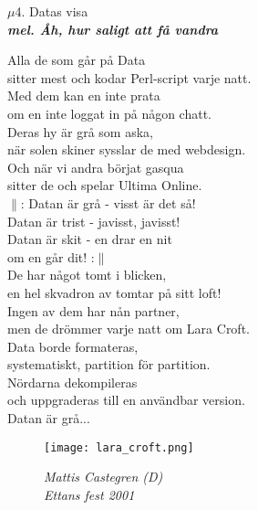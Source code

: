 \documentclass[a6paper,10pt]{article}
\newcommand{\mel}[1]{\small\textbf{\textit{mel. #1 \\}}}
\begin{document}
\setlength{\oddsidemargin}{-0.47in}
\noindent
\begin{center}
\Large $\mu$4. Datas visa\\
\mel{Åh, hur saligt att få vandra}
\end{center}
\vspace{-5pt}
Alla de som går på Data\\
sitter mest och kodar Perl-script varje natt.\\
Med dem kan en inte prata\\
om en inte loggat in på någon chatt.\\
Deras hy är grå som aska,\\
när solen skiner sysslar de med webdesign.\\
Och när vi andra börjat gasqua\\
sitter de och spelar Ultima Online.
\vspace{5pt}\\
$\|$: Datan är grå - visst är det så!\\
Datan är trist - javisst, javisst!\\
Datan är skit - en drar en nit\\
om en går dit! :$\|$
\vspace{5pt}\\
De har något tomt i blicken,\\
en hel skvadron av tomtar på sitt loft!\\
Ingen av dem har nån partner,\\
men de drömmer varje natt om Lara Croft.\\
Data borde formateras,\\
systematiskt, partition för partition.\\
Nördarna dekompileras\\
och uppgraderas till en användbar version.
\vspace{5pt}\\
Datan är grå...
\vspace{-5pt}
\begin{figure}[!h]
\begin{minipage}{0.5\linewidth}
\texttt{[image: lara\_croft.png]}
\end{minipage}
\begin{minipage}{0.48\linewidth}
\begin{flushright}
\textit{Mattis Castegren (D)\\ Ettans fest 2001}
\end{flushright}
\end{minipage}
\end{figure}
\end{document}
